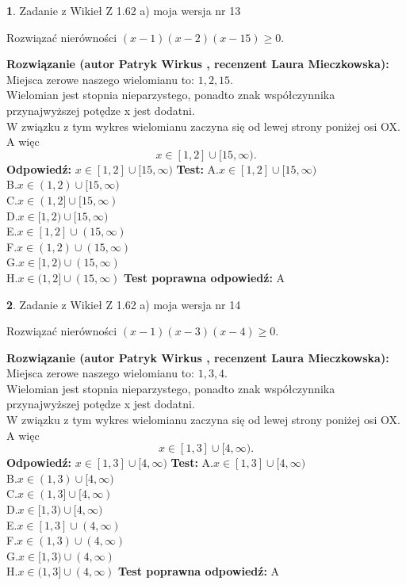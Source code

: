 \documentclass[12pt, a4paper]{article}
\theoremstyle{definition} %
\newtheorem{zad}{}
\newcommand{\zadStart}[1]{\begin{zad}#1\newline}
\newcommand{\zadStop}{\end{zad}}
\newcommand{\rozwStart}[2]{\noindent \textbf{Rozwiązanie (autor #1 , recenzent #2): }\newline}
\newcommand{\rozwStop}{\newline}
\newcommand{\odpStart}{\noindent \textbf{Odpowiedź:}\newline}
\newcommand{\odpStop}{\newline}
\newcommand{\testStart}{\noindent \textbf{Test:}\newline}
\newcommand{\testStop}{\newline}
\newcommand{\kluczStart}{\noindent \textbf{Test poprawna odpowiedź:}\newline}
\newcommand{\kluczStop}{\newline}
\begin{document}
\zadStart{Zadanie z Wikieł Z 1.62 a) moja wersja nr 13}

Rozwiązać nierówności $(x-1)(x-2)(x-15)\ge0$.
\zadStop
\rozwStart{Patryk Wirkus}{Laura Mieczkowska}
Miejsca zerowe naszego wielomianu to: $1, 2, 15$.\\
Wielomian jest stopnia nieparzystego, ponadto znak współczynnika przy\linebreak najwyższej potędze x jest dodatni.\\ W związku z tym wykres wielomianu zaczyna się od lewej strony poniżej osi OX. A więc $$x \in [1,2] \cup [15,\infty).$$
\rozwStop
\odpStart
$x \in [1,2] \cup [15,\infty)$
\odpStop
\testStart
A.$x \in [1,2] \cup [15,\infty)$\\
B.$x \in (1,2) \cup [15,\infty)$\\
C.$x \in (1,2] \cup [15,\infty)$\\
D.$x \in [1,2) \cup [15,\infty)$\\
E.$x \in [1,2] \cup (15,\infty)$\\
F.$x \in (1,2) \cup (15,\infty)$\\
G.$x \in [1,2) \cup (15,\infty)$\\
H.$x \in (1,2] \cup (15,\infty)$
\testStop
\kluczStart
A
\kluczStop



\zadStart{Zadanie z Wikieł Z 1.62 a) moja wersja nr 14}

Rozwiązać nierówności $(x-1)(x-3)(x-4)\ge0$.
\zadStop
\rozwStart{Patryk Wirkus}{Laura Mieczkowska}
Miejsca zerowe naszego wielomianu to: $1, 3, 4$.\\
Wielomian jest stopnia nieparzystego, ponadto znak współczynnika przy\linebreak najwyższej potędze x jest dodatni.\\ W związku z tym wykres wielomianu zaczyna się od lewej strony poniżej osi OX. A więc $$x \in [1,3] \cup [4,\infty).$$
\rozwStop
\odpStart
$x \in [1,3] \cup [4,\infty)$
\odpStop
\testStart
A.$x \in [1,3] \cup [4,\infty)$\\
B.$x \in (1,3) \cup [4,\infty)$\\
C.$x \in (1,3] \cup [4,\infty)$\\
D.$x \in [1,3) \cup [4,\infty)$\\
E.$x \in [1,3] \cup (4,\infty)$\\
F.$x \in (1,3) \cup (4,\infty)$\\
G.$x \in [1,3) \cup (4,\infty)$\\
H.$x \in (1,3] \cup (4,\infty)$
\testStop
\kluczStart
A
\kluczStop
\end{document}
